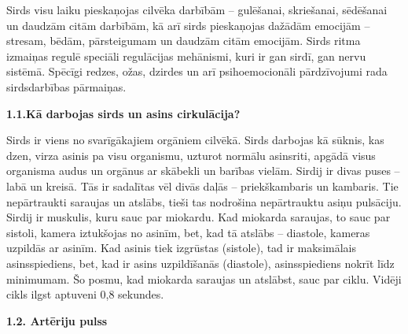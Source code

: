 \documentclass[12pt]{article}
\begin{document}
Sirds visu laiku pieskaņojas cilvēka darbībām – gulēšanai, skriešanai, sēdēšanai un daudzām citām darbībām, kā arī sirds pieskaņojas dažādām emocijām – stresam, bēdām, pārsteigumam un daudzām citām emocijām. Sirds ritma izmaiņas regulē speciāli regulācijas mehānismi, kuri ir gan sirdī, gan nervu sistēmā. Spēcīgi redzes, ožas, dzirdes un arī psihoemocionāli pārdzīvojumi rada sirdsdarbības pārmaiņas. 

\begin{center}
\fontsize{14}{}\selectfont\textbf{1.1.Kā darbojas sirds un asins cirkulācija?}
\end{center}
	 

Sirds ir viens no svarīgākajiem orgāniem cilvēkā. Sirds darbojas kā sūknis, kas dzen, virza asinis pa visu organismu, uzturot normālu asinsriti, apgādā visus organisma audus un orgānus ar skābekli un barības vielām. Sirdij ir divas puses – labā un kreisā. Tās ir sadalītas vēl divās daļās – priekškambaris un kambaris. Tie nepārtraukti saraujas un atslābs, tieši tas nodrošina nepārtrauktu asiņu pulsāciju. Sirdij ir muskulis, kuru sauc par miokardu. Kad miokarda saraujas, to sauc par sistoli, kamera iztukšojas no asinīm, bet, kad tā atslābs – diastole, kameras uzpildās ar asinīm. Kad asinis tiek izgrūstas (sistole), tad ir maksimālais asinsspiediens, bet, kad ir asins uzpildīšanās (diastole), asinsspiediens nokrīt līdz minimumam. Šo posmu, kad miokarda saraujas un atslābst, sauc par ciklu. Vidēji cikls ilgst aptuveni 0,8 sekundes. 

\begin{center}
\fontsize{14}{}\selectfont\textbf{1.2. Artēriju pulss}
\end{center}
\end{document}
